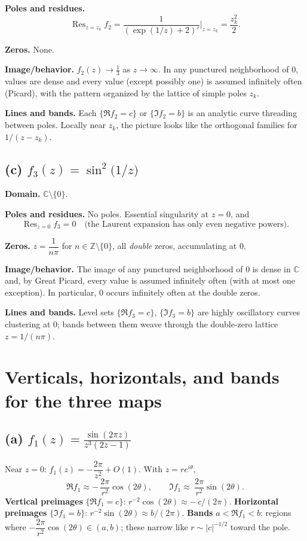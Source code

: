 \documentclass[12pt,a4paper]{article}
\begin{document}
	\textbf{Poles and residues.}
	\[
	\operatorname{Res}_{z=z_k} f_2
	=\frac{1}{(\exp(1/z)+2)'}\Big|_{z=z_k}
	=\frac{z_k^2}{2}.
	\]
	
	\textbf{Zeros.} None.
	
	\textbf{Image/behavior.} \(f_2(z)\to \tfrac13\) as \(z\to\infty\). In any punctured neighborhood of \(0\), values are dense and every value (except possibly one) is assumed infinitely often (Picard), with the pattern organized by the lattice of simple poles \(z_k\).
	
	\textbf{Lines and bands.} Each \(\{\Re f_2=c\}\) or \(\{\Im f_2=b\}\) is an analytic curve threading between poles. Locally near \(z_k\), the picture looks like the orthogonal families for \(1/(z-z_k)\).
	
	\bigskip
	
	\subsection*{(c) \(\displaystyle f_3(z)=\sin^{2}\!\bigl(1/z\bigr)\)}
	\textbf{Domain.} \(\mathbb C\setminus\{0\}\).
	
	\textbf{Poles and residues.} No poles. Essential singularity at \(z=0\), and
	\[
	\operatorname{Res}_{z=0} f_3=0
	\quad\text{(the Laurent expansion has only even negative powers)}.
	\]
	
	\textbf{Zeros.} \(z=\dfrac{1}{n\pi}\) for \(n\in\mathbb Z\setminus\{0\}\), all \emph{double} zeros, accumulating at \(0\).
	
	\textbf{Image/behavior.} The image of any punctured neighborhood of \(0\) is dense in \(\mathbb C\) and, by Great Picard, every value is assumed infinitely often (with at most one exception). In particular, \(0\) occurs infinitely often at the double zeros.
	
	\textbf{Lines and bands.} Level sets \(\{\Re f_3=c\}\), \(\{\Im f_3=b\}\) are highly oscillatory curves clustering at \(0\); bands between them weave through the double-zero lattice \(z=1/(n\pi)\).
	
	
	\section*{Verticals, horizontals, and bands for the three maps}
	
	\subsection*{(a) \(\displaystyle f_1(z)=\frac{\sin(2\pi z)}{z^{3}(2z-1)}\)}
	Near \(z=0\): \(f_1(z)=-\dfrac{2\pi}{z^{2}}+O(1)\).
	With \(z=re^{i\theta}\),
	\[
	\Re f_1 \approx -\,\frac{2\pi}{r^{2}}\cos(2\theta),
	\qquad
	\Im f_1 \approx \ \frac{2\pi}{r^{2}}\sin(2\theta).
	\]
	\textbf{Vertical preimages} \(\{\Re f_1=c\}\): \(r^{-2}\cos(2\theta)\approx -\,c/(2\pi)\).
	\quad
	\textbf{Horizontal preimages} \(\{\Im f_1=b\}\): \(r^{-2}\sin(2\theta)\approx b/(2\pi)\).
	\quad
	\textbf{Bands} \(a<\Re f_1<b\): regions where \(-\dfrac{2\pi}{r^{2}}\cos(2\theta)\in(a,b)\); these narrow like \(r\sim |c|^{-1/2}\) toward the pole.
	
\end{document}
